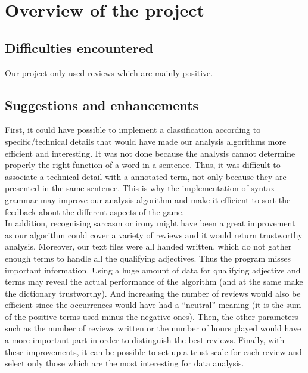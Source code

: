 \documentclass[paper=a4,fontsize=12pt]{report}
\begin{document}
\chapter{Overview of the project}
\section{Difficulties encountered}
Our project only used reviews which are mainly positive. 
\section{Suggestions and enhancements}
First, it could have possible to implement a classification according to specific/technical details that would have made our analysis algorithms more efficient and interesting. It was not done because the analysis cannot determine properly the right function of a word in a sentence. Thus, it was difficult to associate a technical detail with a annotated term, not only because they are presented in the same sentence. This is why the implementation of syntax grammar may improve our analysis algorithm and make it efficient to sort the feedback about the different aspects of the game.
\\
\linebreak
In addition, recognising sarcasm or irony might have been a great improvement as our algorithm could cover a variety of reviews and it would return trustworthy analysis. Moreover, our text files were all handed written, which do not gather enough terms to handle all the qualifying adjectives. Thus the program misses important information. Using a huge amount of data for qualifying adjective and terms may reveal the actual performance of the algorithm (and at the same make the dictionary trustworthy). And increasing the number of reviews would also be efficient since the occurrences would have had a "`neutral"' meaning (it is the sum of the positive terms used minus the negative ones). Then, the other parameters such as the number of reviews written or the number of hours played would have a more important part in order to distinguish the best reviews.
\linebreak 
Finally, with these improvements, it can be possible to set up a trust scale for each review and select only those which are the most interesting for data analysis. 
\end{document}
